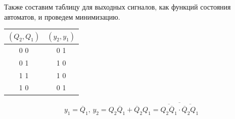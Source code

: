 \documentclass[a4paper,12pt]{article}
\begin{document}
    Также составим таблицу для выходных сигналов, как функций состояния автоматов, и проведем минимизацию.
    \begin{table}[H]
        \centering
        \begin{tabular}{|c|c|}
        \hline
        $(Q_2, Q_1)$ & $(y_2, y_1)$ \\ \hline
        0 0          & 0 1          \\ \hline
        0 1          & 1 0          \\ \hline
        1 1          & 1 0          \\ \hline
        1 0          & 0 1          \\ \hline
        \end{tabular}
    \end{table}
    \[y_1 = \overline{Q}_1, \, y_2 = Q_2 \overline{Q}_1 + \overline{Q}_2 Q_1 = \overline{\overline{Q_2 \overline{Q}_1} \cdot \overline{\overline{Q}_2 Q_1}}\]
\end{document}
